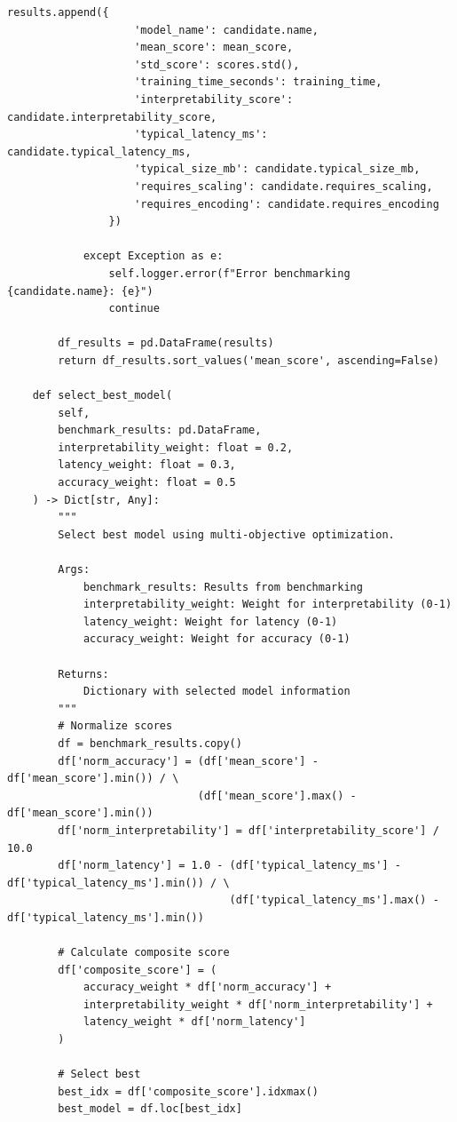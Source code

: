 \begin{lstlisting}[style=python, caption={Automated Model Selection Framework}]
                results.append({
                    'model_name': candidate.name,
                    'mean_score': mean_score,
                    'std_score': scores.std(),
                    'training_time_seconds': training_time,
                    'interpretability_score': candidate.interpretability_score,
                    'typical_latency_ms': candidate.typical_latency_ms,
                    'typical_size_mb': candidate.typical_size_mb,
                    'requires_scaling': candidate.requires_scaling,
                    'requires_encoding': candidate.requires_encoding
                })

            except Exception as e:
                self.logger.error(f"Error benchmarking {candidate.name}: {e}")
                continue

        df_results = pd.DataFrame(results)
        return df_results.sort_values('mean_score', ascending=False)

    def select_best_model(
        self,
        benchmark_results: pd.DataFrame,
        interpretability_weight: float = 0.2,
        latency_weight: float = 0.3,
        accuracy_weight: float = 0.5
    ) -> Dict[str, Any]:
        """
        Select best model using multi-objective optimization.

        Args:
            benchmark_results: Results from benchmarking
            interpretability_weight: Weight for interpretability (0-1)
            latency_weight: Weight for latency (0-1)
            accuracy_weight: Weight for accuracy (0-1)

        Returns:
            Dictionary with selected model information
        """
        # Normalize scores
        df = benchmark_results.copy()
        df['norm_accuracy'] = (df['mean_score'] - df['mean_score'].min()) / \
                              (df['mean_score'].max() - df['mean_score'].min())
        df['norm_interpretability'] = df['interpretability_score'] / 10.0
        df['norm_latency'] = 1.0 - (df['typical_latency_ms'] - df['typical_latency_ms'].min()) / \
                                   (df['typical_latency_ms'].max() - df['typical_latency_ms'].min())

        # Calculate composite score
        df['composite_score'] = (
            accuracy_weight * df['norm_accuracy'] +
            interpretability_weight * df['norm_interpretability'] +
            latency_weight * df['norm_latency']
        )

        # Select best
        best_idx = df['composite_score'].idxmax()
        best_model = df.loc[best_idx]


\end{lstlisting}
